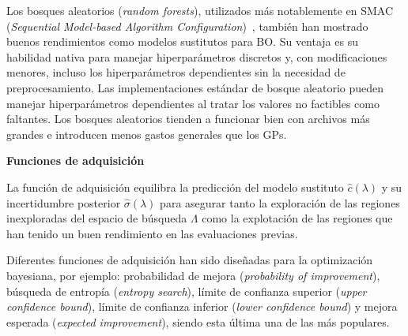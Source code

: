 Los bosques aleatorios (\emph{random forests}), utilizados más notablemente en SMAC (\emph{Sequential Model-based Algorithm Configuration})~\cite{hutter2011sequential}, también han mostrado buenos rendimientos como modelos sustitutos para BO. Su ventaja es su habilidad nativa para manejar hiperparámetros discretos y, con modificaciones menores, incluso los hiperparámetros dependientes sin la necesidad de preprocesamiento. Las implementaciones estándar de bosque aleatorio pueden manejar hiperparámetros dependientes al tratar los valores no factibles como faltantes. Los bosques aleatorios tienden a funcionar bien con archivos más grandes e introducen menos gastos generales que los GPs. %


\quad

\textbf{Funciones de adquisición}

\quad

La función de adquisición equilibra la predicción del modelo sustituto $\hat{c}(\lambda)$ y su incertidumbre posterior $\hat{\sigma}(\lambda)$ para asegurar tanto la exploración de las regiones inexploradas del espacio de búsqueda $\Lambda$ como la explotación de las regiones que han tenido un buen rendimiento en las evaluaciones previas.

Diferentes funciones de adquisición han sido diseñadas para la optimización bayesiana, por ejemplo: probabilidad de mejora (\textit{probability of improvement}), búsqueda de entropía (\textit{entropy search}), límite de confianza superior (\textit{upper confidence bound}), límite de confianza inferior (\textit{lower confidence bound}) y mejora esperada (\textit{expected improvement}), siendo esta última una de las más populares.

